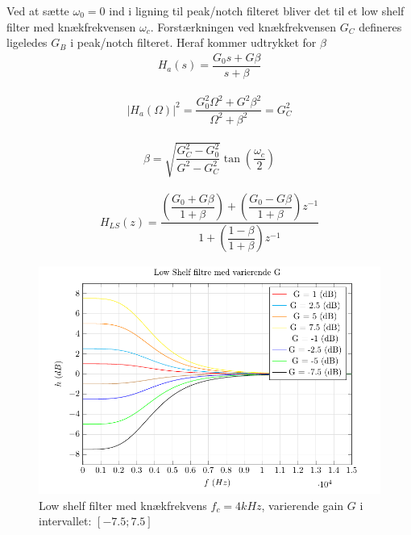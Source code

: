 
    Ved at sætte $\omega_0 = 0$ ind i ligning til peak/notch 
    filteret bliver det til et low shelf filter med knækfrekvensen $\omega_c$. 
    Forstærkningen ved knækfrekvensen $G_C$ defineres ligeledes $G_B$ i peak/notch filteret.
    Heraf kommer udtrykket for $\beta$ 
    \begin{align}
        H_a (s) = \dfrac{G_0 s + G \beta}{s + \beta}
    \end{align}

    \begin{align}
        |H_a (\Omega)|^2 = \dfrac{G_0^2 \Omega^2 + G^2 \beta^2}{\Omega^2 + \beta^2} = G_C^2
    \end{align}

    \begin{align}
        \beta = \sqrt{\dfrac{G_C^2 - G_0^2}{G^2 - G_C^2}} \tan \left( \dfrac{\omega_c}{2} \right)
    \end{align}

  
     \begin{align}
      H_{LS}(z) =   \dfrac{\left(\dfrac{G_0 + G \beta}{1 + \beta} \right)+ \left(\dfrac{ G_0 - G \beta}{1 + \beta }\right) z^{-1}}{1 + \left( \dfrac{1 - \beta}{1 + \beta} \right) z^{-1}}
     \end{align}

    \begin{figure}[h]
    \centering
        \includegraphics{figure/iir_ls.pdf}
        \caption{Low shelf filter med knækfrekvens $f_c = 4kHz$, varierende gain $G$ i intervallet: $[-7.5 ; 7.5]$}
    \end{figure} 
   
